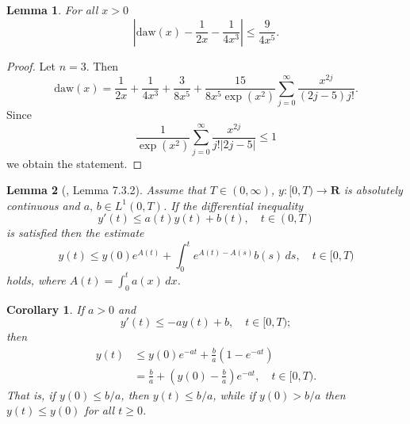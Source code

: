 \documentclass[pdflatex,sn-mathphys-num]{sn-jnl}
\theoremstyle{thmstyleone}
\newtheorem{lemma}{Lemma}[section]
\newtheorem{corollary}{Corollary}[section]
\theoremstyle{thmstyletwo}
\theoremstyle{thmstylethree}
\begin{document}
\begin{lemma}\label{lem:daw_x_estimation} For all $x>0$ 
\begin{equation}
\left| \mathrm{daw}(x)- \frac{1}{2x}-\frac{1}{4x^3}\right| \leq 
\frac{9}{4x^5}.
\end{equation}
\end{lemma}
\begin{proof}
Let $n=3$. Then
\begin{equation*}
\mathrm{daw}(x)=\frac{1}{2x}+\frac{1}{4x^3}+\frac{3}{8x^5}+
\frac{15}{8x^5 \exp(x^2)}\sum_{j=0}^{\infty}\frac{x^{2j}}{(2j-5)j!}.
\end{equation*}
Since
\begin{equation*}
\frac{1}{\exp(x^2)}\sum_{j=0}^{\infty}\frac{x^{2j}}{j!|2j-5|}\leq 1
\end{equation*}
we obtain the statement.
\end{proof}

\begin{lemma}[\cite{Emmrich2004}, Lemma 7.3.2]\label{lem:Gronwall}
Assume that $T\in(0,\infty)$, $y:[0,T)\to\mathbf{R}$ is absolutely 
continuous and $a,\,b\in L^1(0,T)$. If the differential inequality 
\begin{equation}
y'(t)\leq a(t)y(t)+b(t),\quad t\in (0,T)
\end{equation}
is satisfied then the estimate
\begin{equation}
y(t)\leq y(0)e^{A(t)}+\int_0^t e^{A(t)-A(s)}b(s)\,ds, \quad t\in[0,T)
\end{equation}
holds, where $A(t)=\int_0^t a(x)\,dx$.
\end{lemma}

\begin{corollary}\label{cor:diffineq_cor}
If $a>0$ and 
\begin{equation*}
y'(t)\leq -ay(t)+b, \quad t\in[0,T);
\end{equation*}
then
\begin{align*}
y(t) &\leq y(0)e^{-at}+\frac{b}{a}\left(1-e^{-at} \right) \\
&= \frac{b}{a}+\left(y(0)-\frac{b}{a} \right)e^{-at}, \quad t\in[0,T).
\end{align*}
That is, if $y(0)\leq b/a$, then $y(t)\leq b/a$, while if $y(0)>b/a$ 
then $y(t)\leq y(0)$ for all $t\geq 0$.
\end{corollary}
\end{document}
